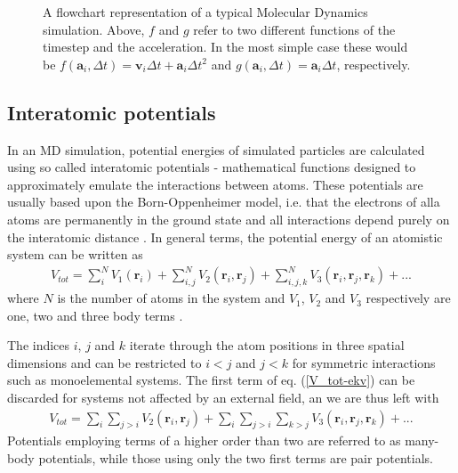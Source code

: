 \begin{figure}
\begin{center}
\endgroup
\caption{A flowchart representation of a typical Molecular Dynamics simulation. Above, $f$ and $g$ refer to two different functions of the timestep and the acceleration. In the most simple case these would be $f(\mathbf{a}_i,\Delta t) = \mathbf{v}_i\Delta t + \mathbf{a}_i\Delta t^2$ and $g(\mathbf{a}_i,\Delta t) = \mathbf{a}_i\Delta t$, respectively.} 
\label{MD-schema}
\end{center}
\end{figure}


\subsection{Interatomic potentials}

In an MD simulation, potential energies of simulated particles are calculated using so called interatomic potentials - mathematical functions designed to approximately emulate the interactions between atoms. 
These potentials are usually based upon the Born-Oppenheimer model, i.e. that the electrons of alla atoms are permanently in the ground state and all interactions depend purely on the interatomic distance \cite{born1927quantentheorie}. 
In general terms, the potential energy of an atomistic system can be written as
\begin{align}
V_{tot} = \sum_i^N V_1(\mathbf{r}_i) + \sum_{i,j}^N V_2(\mathbf{r}_i, \mathbf{r}_j) +  \sum_{i,j,k}^N V_3(\mathbf{r}_i, \mathbf{r}_j, \mathbf{r}_k) + ...
\label{V_tot-ekv}
\end{align}
where $N$ is the number of atoms in the system and $V_1$, $V_2$ and $V_3$ respectively are one, two and three body terms \cite{potentialsTheory}.

The indices $i$, $j$ and $k$ iterate through the atom positions in three spatial dimensions and can be restricted to $i < j$ and $j < k$ for symmetric interactions such as monoelemental systems. 
The first term of eq. (\ref{V_tot-ekv}) can be discarded for systems not affected by an external field, an we are thus left with
\begin{align}
V_{tot} = \sum_i \sum_{j>i} V_2(\mathbf{r}_i, \mathbf{r}_j) + \sum_i \sum_{j>i} \sum_{k > j} V_3(\mathbf{r}_i, \mathbf{r}_j, \mathbf{r}_k) + ...
\end{align}
Potentials employing terms of a higher order than two are referred to as many-body potentials, while those using only the two first terms are pair potentials.

